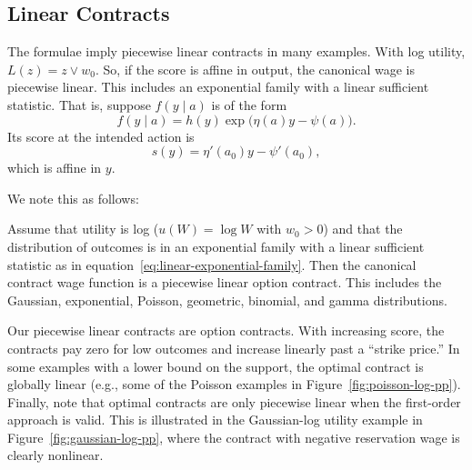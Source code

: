 \subsection{Linear Contracts}
\label{sec:linear-contracts}
The formulae imply piecewise linear contracts in many examples.  With log
utility, $L(z)=z\vee w_0$. So, if the score is affine in output, the canonical wage is piecewise linear. This
includes an exponential family with a linear sufficient statistic.  That is,
suppose $f(y\mid a)$ is of the form
\begin{equation}
    f(y\mid a)
    =h(y)\exp\bigl(\eta(a)y-\psi(a)\bigr).
    \label{eq:linear-exponential-family}
\end{equation}
Its score at the intended action is
\[
    s(y)=\eta'(a_0)y-\psi'(a_0),
\]
which is affine in $y$.

We note this as follows:

\begin{remark}
    \label{rem:linear-contracts}
    Assume that utility is log ($u(W)=\log W$ with $w_0>0$) and that the distribution of outcomes is in an exponential family with a linear sufficient statistic as in equation~\eqref{eq:linear-exponential-family}. Then the canonical contract wage function is a piecewise linear option contract. This includes the Gaussian, exponential, Poisson, geometric, binomial, and gamma distributions.
\end{remark}

Our piecewise linear contracts are option contracts. With increasing score, the contracts pay zero for low outcomes and increase linearly past a ``strike price.'' In some examples with a lower bound on the support, the optimal contract is globally linear (e.g., some of the Poisson examples in Figure~\ref{fig:poisson-log-pp}). Finally, note that optimal contracts are only piecewise linear when the first-order approach is valid. This is illustrated in the Gaussian-log utility example in Figure~\ref{fig:gaussian-log-pp}, where the contract with negative reservation wage is clearly nonlinear.
